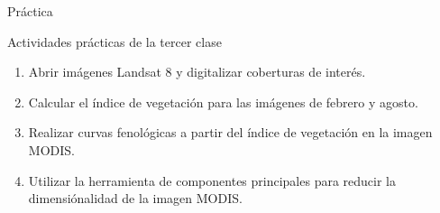 \documentclass[handout]{beamer}
\begin{document}
\begin{frame}{Pr\'actica}
  \begin{exampleblock}{Actividades pr\'acticas de la tercer clase}
    \begin{enumerate}
      \item Abrir im\'agenes Landsat 8 y digitalizar coberturas de inter\'es.
      \item Calcular el \'indice de vegetaci\'on para las im\'agenes de febrero y agosto.
      \item Realizar curvas fenol\'ogicas a partir del \'indice de vegetaci\'on en la imagen MODIS.
      \item Utilizar la herramienta de componentes principales para reducir la dimensi\'onalidad de la imagen MODIS.
    \end{enumerate}
  \end{exampleblock}
\end{frame}
\end{document}

